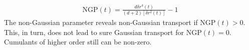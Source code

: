 \documentclass[
  a4paper,BCOR10mm,twoside,
  headsepline,footsepline,%
  fleqn,openbib
]{scrbook}
\begin{document}
\begin{align}
 \mathrm{NGP}(t)=\frac{d \delta r^{4}(t)}{(d+2) [\delta r^{2}(t)]}-1 \label{nongaussian2}
\end{align}
The non-Gaussian parameter reveals non-Gaussian transport if $\mathrm{NGP}(t)>0$. This, in turn, does not lead to sure Gaussian transport for $\mathrm{NGP}(t)=0$. Cumulants of higher order still can be non-zero. 

\end{document}
